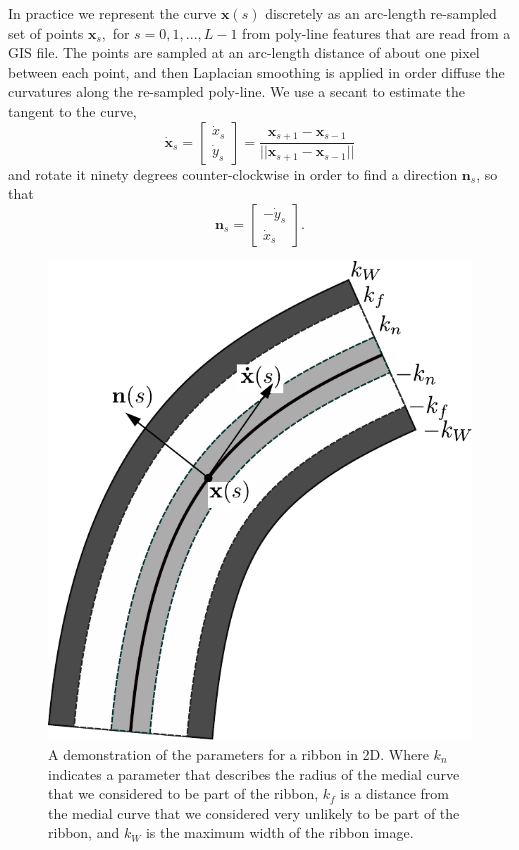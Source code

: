 In practice we represent the curve $\mathbf{x}(s)$ discretely as an arc-length re-sampled set of points $\mathbf{x}_s,$ for $s=0,1,...,L-1$ from poly-line features that are read from a GIS file. The points are sampled at an arc-length distance of about one pixel between each point, and then Laplacian smoothing is applied in order diffuse the curvatures along the re-sampled poly-line.  
We use a secant to estimate the tangent to the curve,
\[\dot{\mathbf{x}}_s = \left[\begin{array}{c} \dot{x}_s \\ \dot{y}_s \end{array}\right]= \frac{\mathbf{x}_{s+1}-\mathbf{x}_{s-1}}{||\mathbf{x}_{s+1}-\mathbf{x}_{s-1}||} \] and rotate it ninety degrees counter-clockwise in order to find a direction  $\mathbf{n}_s$, so that 
\[\mathbf{n}_s = \left[\begin{array}{c} -\dot{y}_s \\ \dot{x}_s \end{array}\right]. \]

\begin{figure}
    \centering
    \includegraphics[width=\textwidth]{Figures/sw-figure.pdf}
    \caption[2D Ribbon Image]{A demonstration of the parameters for a ribbon in 2D. Where $k_n$ indicates a parameter that describes the radius of the medial curve that we considered to be part of the ribbon, $k_f$ is a distance from the medial curve that we considered very unlikely to be part of the ribbon, and $k_W$ is the maximum width of the ribbon image.}
    \label{fig:2d_ribbon}
\end{figure}

